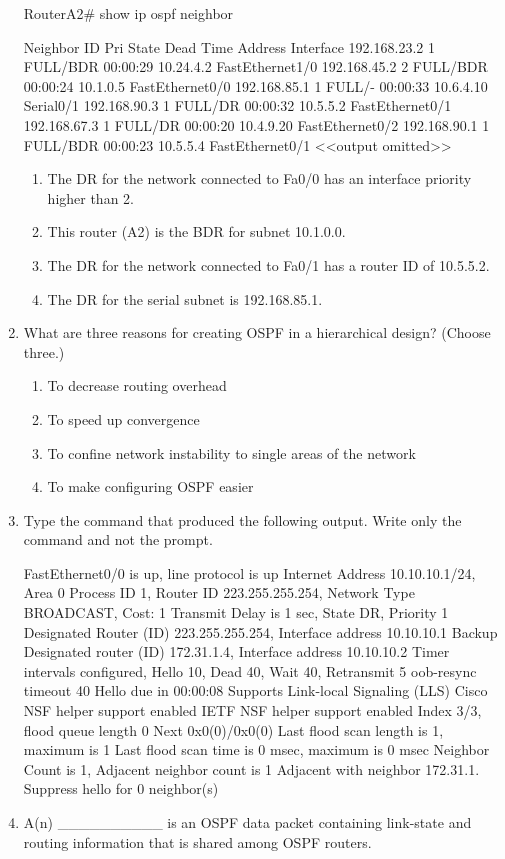 \begin{enumerate}
\begin{cli}
RouterA2# show ip ospf neighbor

Neighbor ID Pri State Dead Time Address Interface
192.168.23.2 1 FULL/BDR 00:00:29 10.24.4.2 FastEthernet1/0
192.168.45.2 2 FULL/BDR 00:00:24 10.1.0.5 FastEthernet0/0
192.168.85.1 1 FULL/- 00:00:33 10.6.4.10 Serial0/1
192.168.90.3 1 FULL/DR 00:00:32 10.5.5.2 FastEthernet0/1
192.168.67.3 1 FULL/DR 00:00:20 10.4.9.20 FastEthernet0/2
192.168.90.1 1 FULL/BDR 00:00:23 10.5.5.4 FastEthernet0/1
<<output omitted>>
\end{cli}

  \begin{enumerate}
  \def\labelenumii{\Alph{enumii}.}
    \item
    The DR for the network connected to Fa0/0 has an interface priority
    higher than 2.
  \item
    This router (A2) is the BDR for subnet 10.1.0.0.
  \item
    The DR for the network connected to Fa0/1 has a router ID of
    10.5.5.2.
  \item
    The DR for the serial subnet is 192.168.85.1.
  \end{enumerate}
\item
  What are three reasons for creating OSPF in a hierarchical design?
  (Choose three.)

  \begin{enumerate}
  \def\labelenumii{\Alph{enumii}.}
    \item
    To decrease routing overhead
  \item
    To speed up convergence
  \item
    To confine network instability to single areas of the network
  \item
    To make configuring OSPF easier
  \end{enumerate}
\item
  Type the command that produced the following output. Write only the
  command and not the prompt.

\begin{cli}
FastEthernet0/0 is up, line protocol is up
  Internet Address 10.10.10.1/24, Area 0
  Process ID 1, Router ID 223.255.255.254, Network Type BROADCAST, Cost: 
1 Transmit Delay is 1 sec, State DR, Priority 1
  Designated Router (ID) 223.255.255.254, Interface address 10.10.10.1
Backup Designated router (ID) 172.31.1.4, Interface address 10.10.10.2
Timer intervals configured, Hello 10, Dead 40, Wait 40, Retransmit 5
    oob-resync timeout 40
    Hello due in 00:00:08
  Supports Link-local Signaling (LLS)
  Cisco NSF helper support enabled
  IETF NSF helper support enabled
  Index 3/3, flood queue length 0
  Next 0x0(0)/0x0(0)
  Last flood scan length is 1, maximum is 1
  Last flood scan time is 0 msec, maximum is 0 msec
  Neighbor Count is 1, Adjacent neighbor count is 1
    Adjacent with neighbor 172.31.1.  Suppress hello for 0 neighbor(s)
\end{cli}
\item
  A(n) \_\_\_\_\_\_\_\_\_\_ is an OSPF data packet containing link-state
  and routing information that is shared among OSPF routers.


\end{enumerate}

